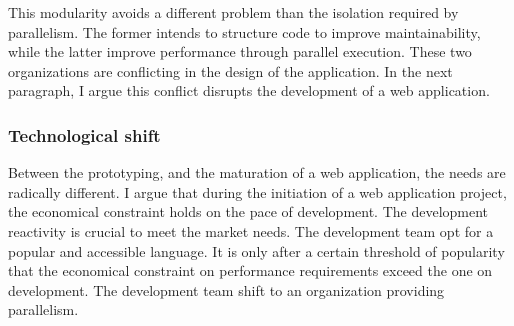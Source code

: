 This modularity avoids a different problem than the isolation required by parallelism.
The former intends to structure code to improve maintainability, while the latter improve performance through parallel execution.
These two organizations are conflicting in the design of the application.
In the next paragraph, I argue this conflict disrupts the development of a web application.



\subsubsection{Technological shift}

Between the prototyping, and the maturation of a web application, the needs are radically different.
I argue that during the initiation of a web application project, the economical constraint holds on the pace of development.
The development reactivity is crucial to meet the market needs.
The development team opt for a popular and accessible language.
It is only after a certain threshold of popularity that the  economical constraint on performance requirements exceed the one on development.
The development team shift to an organization providing parallelism.


